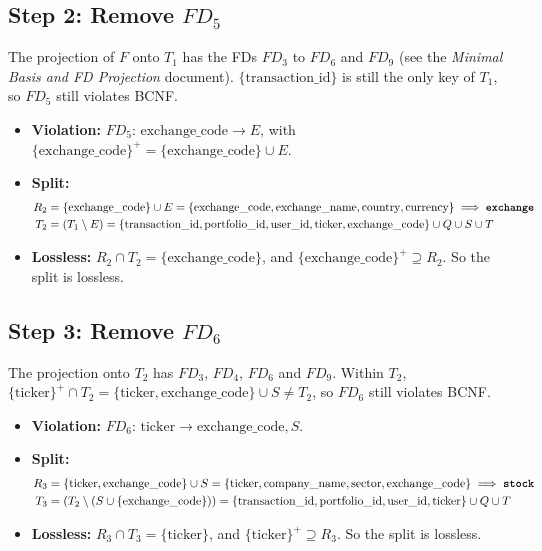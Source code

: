 \documentclass{article}
\newcommand{\at}[1]{\text{#1}}
\newcommand{\cl}[1]{\{#1\}^+}
\begin{document}
\subsection*{Step 2: Remove $FD_5$}

The projection of $F$ onto $T_1$ has the FDs $FD_3$ to $FD_6$ and $FD_9$ (see the \emph{Minimal Basis and FD Projection} document). $\{\at{transaction\_id}\}$ is still the only key of $T_1$, so $FD_5$ still violates BCNF.
\begin{itemize}[leftmargin=*]
  \item \textbf{Violation:} $FD_5$: $\at{exchange\_code} \rightarrow E$, with $\cl{\at{exchange\_code}} = \{\at{exchange\_code}\} \cup E$.
  \item \textbf{Split:}
  \begin{align*}
    R_2 &= \{\at{exchange\_code}\} \cup E = \{\at{exchange\_code}, \at{exchange\_name}, \at{country}, \at{currency}\} \implies \textbf{\texttt{exchange}} \\
    T_2 &= (T_1 \setminus E) = \{\at{transaction\_id}, \at{portfolio\_id}, \at{user\_id}, \at{ticker}, \at{exchange\_code}\} \cup Q \cup S \cup T
  \end{align*}
  \item \textbf{Lossless:} $R_2 \cap T_2 = \{\at{exchange\_code}\}$, and $\cl{\at{exchange\_code}} \supseteq R_2$. So the split is lossless.
\end{itemize}

\subsection*{Step 3: Remove $FD_6$}

The projection onto $T_2$ has $FD_3$, $FD_4$, $FD_6$ and $FD_9$. Within $T_2$, $\cl{\at{ticker}} \cap T_2 = \{\at{ticker}, \at{exchange\_code}\} \cup S \neq T_2$, so $FD_6$ still violates BCNF.
\begin{itemize}[leftmargin=*]
  \item \textbf{Violation:} $FD_6$: $\at{ticker} \rightarrow \at{exchange\_code}, S$.
  \item \textbf{Split:}
  \begin{align*}
    R_3 &= \{\at{ticker}, \at{exchange\_code}\} \cup S = \{\at{ticker}, \at{company\_name}, \at{sector}, \at{exchange\_code}\} \implies \textbf{\texttt{stock}} \\
    T_3 &= (T_2 \setminus (S \cup \{\at{exchange\_code}\})) = \{\at{transaction\_id}, \at{portfolio\_id}, \at{user\_id}, \at{ticker}\} \cup Q \cup T
  \end{align*}
  \item \textbf{Lossless:} $R_3 \cap T_3 = \{\at{ticker}\}$, and $\cl{\at{ticker}} \supseteq R_3$. So the split is lossless.
\end{itemize}
\end{document}
